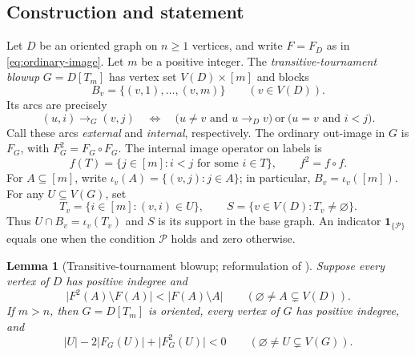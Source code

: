 \documentclass[11pt]{article}
\newcommand{\abs}[1]{\lvert#1\rvert}
\newcommand{\ind}[1]{\mathbf 1_{\{#1\}}}
\newtheorem{lemma}[theorem]{Lemma}
\begin{document}
\subsection{Construction and statement}
Let $D$ be an oriented graph on $n\ge1$ vertices, and write $F=F_D$
as in \eqref{eq:ordinary-image}. Let $m$ be a positive integer. The
\emph{transitive-tournament blowup} $G=D[T_m]$ has vertex set
$V(D)\times[m]$ and blocks
\[
 B_v=\{(v,1),\ldots,(v,m)\}\qquad(v\in V(D)).
\]
Its arcs are precisely
\begin{equation}
 (u,i)\to_G(v,j)
 \quad\Longleftrightarrow\quad
 \bigl(u\ne v\text{ and }u\to_Dv\bigr)
 \ \text{or}\ 
 \bigl(u=v\text{ and }i<j\bigr).
 \label{eq:blowup-arcs}
\end{equation}
Call these arcs \emph{external} and \emph{internal}, respectively.
The ordinary out-image in $G$ is $F_G$, with $F_G^2=F_G\circ F_G$.
The internal image operator on labels is
\[
 f(T)=\{j\in[m]: i<j\text{ for some }i\in T\},
 \qquad f^2=f\circ f.
\]
For $A\subseteq[m]$, write $\iota_v(A)=\{(v,j):j\in A\}$; in
particular, $B_v=\iota_v([m])$. For any $U\subseteq V(G)$, set
\begin{equation}
 T_v=\{i\in[m]:(v,i)\in U\},\qquad
 S=\{v\in V(D):T_v\ne\varnothing\}.
 \label{eq:selection}
\end{equation}
Thus $U\cap B_v=\iota_v(T_v)$ and $S$ is its support in the base
graph. An indicator $\ind{\mathcal P}$ equals one when the condition
$\mathcal P$ holds and zero otherwise.

\begin{lemma}[Transitive-tournament blowup; reformulation of {\cite[Lemma 2.3]{openai}}]
\label{lem:blowup}
Suppose every vertex of $D$ has positive indegree and
\[
 \abs{F^2(A)\setminus F(A)}<\abs{F(A)\setminus A}
        \qquad(\varnothing\ne A\subsetneq V(D)).
\]
If $m>n$, then $G=D[T_m]$ is oriented, every vertex of $G$ has
positive indegree, and
\[
 \abs U-2\abs{F_G(U)}+\abs{F_G^2(U)}<0
        \qquad(\varnothing\ne U\subsetneq V(G)).
\]
\end{lemma}
\end{document}
